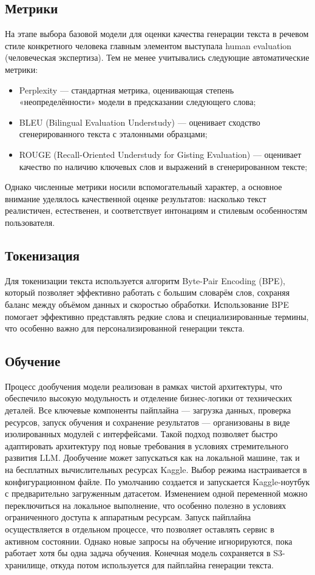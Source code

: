 \subsection{Метрики}
На этапе выбора базовой модели для оценки качества генерации текста в речевом стиле конкретного человека главным элементом выступала human evaluation (человеческая экспертиза). Тем не менее учитывались следующие автоматические метрики:
\begin{itemize}
\item Perplexity — стандартная метрика, оценивающая степень «неопределённости» модели в предсказании следующего слова;
\item BLEU (Bilingual Evaluation Understudy) — оценивает сходство сгенерированного текста с эталонными образцами;
\item ROUGE (Recall-Oriented Understudy for Gisting Evaluation) — оценивает качество по наличию ключевых слов и выражений в сгенерированном тексте;
\end{itemize}
Однако численные метрики носили вспомогательный характер, а основное внимание уделялось качественной оценке результатов: насколько текст реалистичен, естественен, и соответствует интонациям и стилевым особенностям пользователя.


\subsection{Токенизация}
Для токенизации текста используется алгоритм Byte-Pair Encoding (BPE), который позволяет эффективно работать с большим словарём слов, сохраняя баланс между объёмом данных и скоростью обработки. Использование BPE помогает эффективно представлять редкие слова и специализированные термины, что особенно важно для персонализированной генерации текста.

\subsection{Обучение}

Процесс дообучения модели реализован в рамках чистой архитектуры, что обеспечило высокую модульность и отделение бизнес-логики от технических деталей. Все ключевые компоненты пайплайна — загрузка данных, проверка ресурсов, запуск обучения и сохранение результатов — организованы в виде изолированных модулей с интерфейсами. Такой подход позволяет быстро адаптировать архитектуру под новые требования в условиях стремительного развития LLM.
Дообучение может запускаться как на локальной машине, так и на бесплатных вычислительных ресурсах Kaggle. Выбор режима настраивается в конфигурационном файле. По умолчанию создается и запускается Kaggle-ноутбук с предварительно загруженным датасетом. Изменением одной переменной можно переключиться на локальное выполнение, что особенно полезно в условиях ограниченного доступа к аппаратным ресурсам.
Запуск пайплайна осуществляется в отдельном процессе, что позволяет оставлять сервис в активном состоянии. Однако новые запросы на обучение игнорируются, пока работает хотя бы одна задача обучения.
Конечная модель сохраняется в S3-хранилище, откуда потом используется для пайплайна генерации текста.

